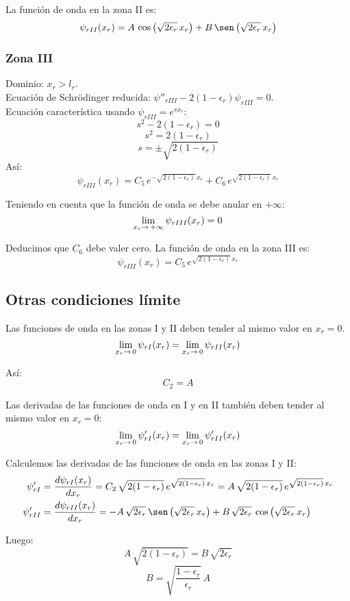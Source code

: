 La función de onda en la zona II es:
\[
\psi_{rII}(x_r)
= A\,\cos\left(\sqrt{2\epsilon_r}\,x_r\right)
 + B\,\sen\left(\sqrt{2\epsilon_r}\,x_r\right)
\]

\subsubsection{Zona III}
\noindent
Dominio: $x_r > l_r$.\\
Ecuación de Schrödinger reducida:
$\psi''_{rIII} - 2(1-\epsilon_r)\psi_{rIII}= 0$.\\
Ecuación característica usando $\psi_{rIII}=e^{sx_r}$:
\[
s^2-2(1-\epsilon_r)=0
\]
\[
s^2=2(1-\epsilon_r)
\]
\[
s = \pm\sqrt{2(1-\epsilon_r)}
\]
Así:
\[
\psi_{rIII}(x_r)
 = C_5\,e^{-\sqrt{2(1-\epsilon_r)}\,x_r} + C_6\,e^{\sqrt{2(1-\epsilon_r)}\,x_r}
\]

Teniendo en cuenta que la función de onda se debe anular en $+\infty$:
\[
\lim_{\scriptsize x_r\to\, +\infty} \psi_{rIII}(x_r) = 0
\]

Deducimos que $C_6$ debe valer cero. La función de onda en la zona III es:
\[
\psi_{rIII}(x_r) = C_5\,e^{\sqrt{2(1-\epsilon_r)}\,x_r}
\]

\subsection{Otras condiciones límite}

Las funciones de onda en las zonas I y II deben tender al mismo valor en
$x_r=0$.
\[
\lim_{\scriptsize x_r\to\,0} \psi_{rI}(x_r)
=
\lim_{\scriptsize x_r\to\,0} \psi_{rII}(x_r)
\]

Así:
\[
C_2 = A
\]

Las derivadas de las funciones de onda en I y en II también deben tender al
mismo valor en $x_r=0$:
\[
\lim_{\scriptsize x_r\to\,0} \psi'_{rI}(x_r)
=
\lim_{\scriptsize x_r\to\,0} \psi'_{rII}(x_r)
\]

Calculemos las derivadas de las funciones de onda en las zonas I y II:
\begin{align*}
\psi'_{rI} &= \frac{d\psi_{rI}(x_r)}{dx_r}
  = C_2\,\sqrt{2(1-\epsilon_r)}\,e^{\sqrt{2(1-\epsilon_r)}\,x_r}
  = A\,\sqrt{2(1-\epsilon_r)}\,e^{\sqrt{2(1-\epsilon_r)}\,x_r}\\
\psi'_{rII} &= \frac{d\psi_{rII}(x_r)}{dx_r}
  = -A\,\sqrt{2\epsilon_r}\,\sen\left(\sqrt{2\epsilon_r}\,x_r\right)
  + B\,\sqrt{2\epsilon_r}\,\cos\left(\sqrt{2\epsilon_r}\,x_r\right)
\end{align*}

Luego:
\[
A\,\sqrt{2(1-\epsilon_r)} =  B\,\sqrt{2\epsilon_r}
\]
\[
B = \sqrt{\frac{1-\epsilon_r}{\epsilon_r}}\,A
\]

